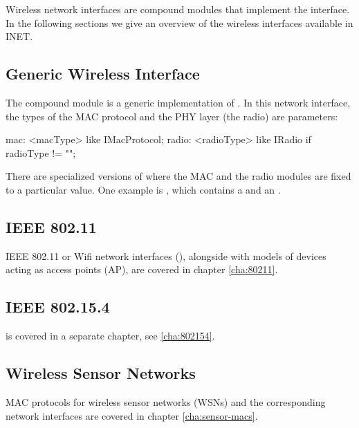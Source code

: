 Wireless network interfaces are compound modules that implement the
 interface. In the following sections we
give an overview of the wireless interfaces available in INET.

\subsection{Generic Wireless Interface}
\label{sec:interfaces:generic-wireless-interface}

The  compound module is a generic implementation
of . In this network interface, the types of the
MAC protocol and the PHY layer (the radio) are parameters:

\begin{ned}
mac: <macType> like IMacProtocol;
radio: <radioType> like IRadio if radioType != "";
\end{ned}

There are specialized versions of  where
the MAC and the radio modules are fixed to a particular value.
One example is , which contains a 
and an .

\subsection{IEEE 802.11}
\label{sec:interfaces:ieee-80211}

IEEE 802.11 or Wifi network interfaces (),
alongside with models of devices acting as access points (AP),
are covered in chapter \ref{cha:80211}.

\subsection{IEEE 802.15.4}
\label{sec:interfaces:ieee-802154}

 is covered in a separate chapter, see \ref{cha:802154}.

\subsection{Wireless Sensor Networks}
\label{sec:interfaces:wireless-sensor-networks}

MAC protocols for wireless sensor networks (WSNs) and the corresponding
network interfaces are covered in chapter \ref{cha:sensor-macs}.


